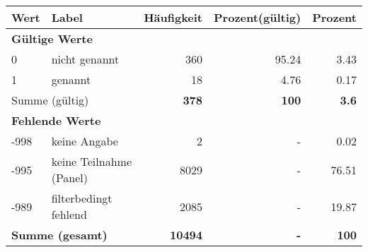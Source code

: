      \begin{longtable}{lXrrr}
     \toprule
     \textbf{Wert} & \textbf{Label} & \textbf{Häufigkeit} & \textbf{Prozent(gültig)} & \textbf{Prozent} \\
     \endhead
     \midrule
     \multicolumn{5}{l}{\textbf{Gültige Werte}}\\

     0 &
     \multicolumn{1}{X}{ nicht genannt   } &


       \num{360} &
       \num[round-mode=places,round-precision=2]{95,24} &
         \num[round-mode=places,round-precision=2]{3,43} \\

     1 &
     \multicolumn{1}{X}{ genannt   } &


       \num{18} &
       \num[round-mode=places,round-precision=2]{4,76} &
         \num[round-mode=places,round-precision=2]{0,17} \\
     \midrule
     \multicolumn{2}{l}{Summe (gültig)} &
       \textbf{\num{378}} &
     \textbf{100} &
       \textbf{\num[round-mode=places,round-precision=2]{3,6}} \\
     \multicolumn{5}{l}{\textbf{Fehlende Werte}}\\
       -998 &
       keine Angabe &
         \num{2} &
        - &
         \num[round-mode=places,round-precision=2]{0,02} \\
       -995 &
       keine Teilnahme (Panel) &
         \num{8029} &
        - &
         \num[round-mode=places,round-precision=2]{76,51} \\
       -989 &
       filterbedingt fehlend &
         \num{2085} &
        - &
         \num[round-mode=places,round-precision=2]{19,87} \\
     \midrule
     \multicolumn{2}{l}{\textbf{Summe (gesamt)}} &
          \textbf{\num{10494}} &
        \textbf{-} &
        \textbf{100} \\
     \bottomrule
     \end{longtable}
     
